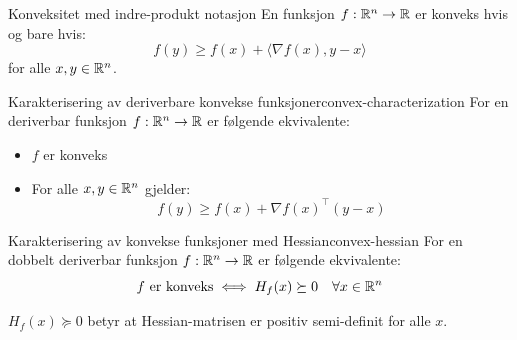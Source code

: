 \begin{remark}{Konveksitet med indre-produkt notasjon}{}
  En funksjon  \(f: \mathbb{R}^n \to \mathbb{R}\) er konveks hvis og bare hvis:
  \[
    f(y) \geq f(x) + \langle \nabla f(x), y - x \rangle
  \]
  for alle  \(x, y \in \mathbb{R}^n\).
\end{remark}

\begin{theorem}{Karakterisering av deriverbare konvekse funksjoner}{convex-characterization}
  For en deriverbar funksjon  \(f: \mathbb{R}^n \to \mathbb{R}\) er følgende ekvivalente:
  \begin{itemize}
    \item  \(f\) er konveks
    \item For alle  \(x, y \in \mathbb{R}^n\) gjelder:
          \[
            f(y) \geq f(x) + \nabla f(x)^\top (y - x)
          \]
  \end{itemize}
\end{theorem}

\begin{theorem}{Karakterisering av konvekse funksjoner med Hessian}{convex-hessian}
  For en dobbelt deriverbar funksjon  \(f: \mathbb{R}^n \to \mathbb{R}\) er følgende ekvivalente:
  \[
    f \text{ er konveks} \iff H_f(x) \succeq 0 \quad \forall x \in \mathbb{R}^n
  \]

  \(H_f(x) \succeq 0\) betyr at Hessian-matrisen er positiv semi-definit for alle  \(x\).

\end{theorem}

